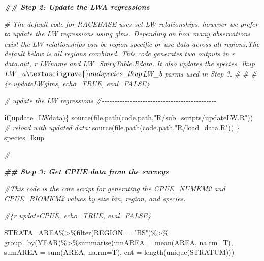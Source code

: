 \documentclass[
]{article}
\newenvironment{Shaded}{\begin{snugshade}}{\end{snugshade}}
\newcommand{\AttributeTok}[1]{\textcolor[rgb]{0.77,0.63,0.00}{#1}}
\newcommand{\CommentTok}[1]{\textcolor[rgb]{0.56,0.35,0.01}{\textit{#1}}}
\newcommand{\ControlFlowTok}[1]{\textcolor[rgb]{0.13,0.29,0.53}{\textbf{#1}}}
\newcommand{\DocumentationTok}[1]{\textcolor[rgb]{0.56,0.35,0.01}{\textbf{\textit{#1}}}}
\newcommand{\FunctionTok}[1]{\textcolor[rgb]{0.00,0.00,0.00}{#1}}
\newcommand{\NormalTok}[1]{#1}
\newcommand{\SpecialCharTok}[1]{\textcolor[rgb]{0.00,0.00,0.00}{#1}}
\newcommand{\StringTok}[1]{\textcolor[rgb]{0.31,0.60,0.02}{#1}}
\begin{document}
\begin{Shaded}
\begin{Highlighting}[]
\DocumentationTok{\#\# Step 2: Update the LWA regressions}

\CommentTok{\# The default code for RACEBASE uses set LW relationships, however we prefer to update the LW regressions using glms. Depending on how many observations exist the LW relationships can be region specific or use data across all regions.The default below is all regions combined. This code generates two outputs in \textasciigrave{}r data.out\textasciigrave{}, \textasciigrave{}r LWname\textasciigrave{} and \textasciigrave{}LW\_SmryTable.Rdata\textasciigrave{}. It also updates the \textasciigrave{}species\_lkup$LW\_a\textasciigrave{} and species\_lkup$LW\_b\textasciigrave{} parms used in Step 3.}
\CommentTok{\# }
\CommentTok{\# \#\textasciigrave{}\textasciigrave{}\textasciigrave{}\{r updateLWglms, echo=TRUE, eval=FALSE\}    }

  \CommentTok{\# update the LW regressions }
  \CommentTok{\#{-}{-}{-}{-}{-}{-}{-}{-}{-}{-}{-}{-}{-}{-}{-}{-}{-}{-}{-}{-}{-}{-}{-}{-}{-}{-}{-}{-}{-}{-}{-}{-}{-}{-}{-}{-}{-}{-}{-}{-}{-}{-}{-}{-}{-}  }

  \ControlFlowTok{if}\NormalTok{(update\_LWdata)\{    }
     \FunctionTok{source}\NormalTok{(}\FunctionTok{file.path}\NormalTok{(code.path,}\StringTok{"R/sub\_scripts/updateLW.R"}\NormalTok{))}
     \CommentTok{\# reload with updated data:}
     \FunctionTok{source}\NormalTok{(}\FunctionTok{file.path}\NormalTok{(code.path,}\StringTok{"R/load\_data.R"}\NormalTok{))}
\NormalTok{  \}}
\NormalTok{  species\_lkup}

\CommentTok{\#\textasciigrave{}\textasciigrave{}\textasciigrave{}}


\DocumentationTok{\#\# Step 3: Get CPUE data from the surveys}

\CommentTok{\#This code is the core script for generating the CPUE\_NUMKM2 and CPUE\_BIOMKM2 values by size bin, region, and species. }

\CommentTok{\#\textasciigrave{}\textasciigrave{}\textasciigrave{}\{r updateCPUE, echo=TRUE, eval=FALSE\} }
  
\NormalTok{  STRATA\_AREA}\SpecialCharTok{\%\textgreater{}\%}\FunctionTok{filter}\NormalTok{(REGION}\SpecialCharTok{==}\StringTok{"BS"}\NormalTok{)}\SpecialCharTok{\%\textgreater{}\%}
    \FunctionTok{group\_by}\NormalTok{(YEAR)}\SpecialCharTok{\%\textgreater{}\%}\FunctionTok{summarise}\NormalTok{(}\AttributeTok{mnAREA  =} \FunctionTok{mean}\NormalTok{(AREA, }\AttributeTok{na.rm=}\NormalTok{T),}
                               \AttributeTok{sumAREA =} \FunctionTok{sum}\NormalTok{(AREA, }\AttributeTok{na.rm=}\NormalTok{T),}
                               \AttributeTok{cnt =} \FunctionTok{length}\NormalTok{(}\FunctionTok{unique}\NormalTok{(STRATUM)))}
  

\end{Highlighting}
\end{Shaded}
\end{document}
